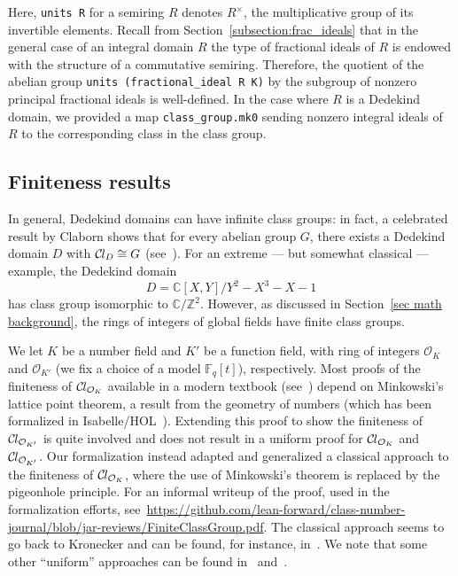 \documentclass[sn-mathphys]{sn-jnl}%
\renewcommand{\C}{\mathbb{C}}
\newcommand{\lean}[1]{\texttt{#1}\xspace}
\newcommand*{\OK}[1][K]{\mathcal{O}_{#1}}
\newcommand*{\Cl}{\mathcal{C}\kern-.075em l}
\newcommand*{\Fq}[1][q]{\mathbb{F}_{#1}}
\renewcommand{\Z}{\mathbb{Z}}
\begin{document}
Here, \lean{units R} for a semiring $R$ denotes $R^\times$, the multiplicative group of its invertible elements.
Recall from Section~\ref{subsection:frac_ideals} that in the general case of an integral domain $R$ %
 the type of fractional ideals of $R$ is endowed with the structure of a commutative semiring.
Therefore, the quotient of the abelian group \lean{units (fractional\_ideal R K)} by the subgroup of nonzero principal fractional ideals is well-defined.
In the case where $R$ is a Dedekind domain, we provided a map \lean{class\_group.mk0} sending nonzero integral ideals of $R$ to the corresponding class in the class group.

\subsection{Finiteness results}\label{subsec:finiteness}

In general, Dedekind domains can have infinite class groups: in fact, a celebrated result by Claborn shows that for every abelian group $G$, there exists a Dedekind domain $D$ with $\Cl_D\cong G$ (see~\cite[Theorem~7]{Cla66}). For an extreme --- but somewhat classical --- example, the Dedekind domain
\[
D=\C[X,Y]/Y^2-X^3-X-1  
\]
has class group isomorphic to $\C/\Z^2$. However, as discussed in Section~\ref{sec math background}, the rings of integers of global fields have finite class groups.

We let $K$ be a number field and $K'$ be a function field, with ring of integers $\OK$ and $\OK[K']$ (we fix a choice of a model $\Fq[q][t]$), respectively. 
Most proofs of the finiteness of $\Cl_{\OK}$ available in a modern textbook (see~\cite[Theorems 4.4,~5.3,~6.3]{Neukirch}) depend on Minkowski's lattice point theorem, a result from the geometry of numbers (which has been formalized in Isabelle/HOL~\cite{Minkowskis_Theorem-AFP}).
Extending this proof to show the finiteness of $\Cl_{\OK[K']}$ is quite involved and does not result in a uniform proof for $\Cl_{\OK}$ and $\Cl_{\OK[K']}$.
Our formalization instead adapted and generalized a classical approach to the finiteness of $\Cl_{\OK}$, where the use of Minkowski's theorem is replaced by the pigeonhole principle. 
For an informal writeup of the proof, used in the formalization efforts, see~\url{https://github.com/lean-forward/class-number-journal/blob/jar-reviews/FiniteClassGroup.pdf}.
The classical approach seems to go back to Kronecker
and can be found, for instance, in~\cite{Ireland-Rosen}.
We note that some other ``uniform'' approaches can be found in~\cite{Artin-Whaples} and~\cite{Stasinski}.
\end{document}
